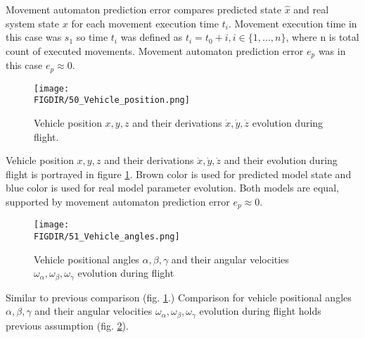 \noindent Movement automaton prediction error compares predicted state $\hat{x}$ and real system state $x$ for each movement execution time $t_i$. Movement execution time in this case was $s_1$ so time $t_i$ was defined as $t_i=t_0+i, i\in\{1,\dots,n\}$, where n is total count of executed movements. Movement automaton prediction error $e_p$ was in this case $e_p\approx 0$.
\begin{figure}[H]
    \centering
    \texttt{[image: \\FIGDIR/50\_Vehicle\_position.png]}
    \caption{Vehicle position $x,y,z$ and their derivations $\dot{x},\dot{y},\dot{z}$ evolution during flight.}
    \label{fig:vehicleStateGrid1}
\end{figure}
\noindent Vehicle position $x,y,z$ and their derivations $\dot{x},\dot{y},\dot{z}$ and their evolution during flight is portrayed in figure \ref{fig:vehicleStateGrid1}. Brown color is used for predicted model state and blue color is used for real model parameter evolution. Both models are equal, supported by movement automaton prediction error $e_p\approx 0$.
\begin{figure}[H]
    \centering
    \texttt{[image: \\FIGDIR/51\_Vehicle\_angles.png]}
    \caption{Vehicle positional angles $\alpha,\beta,\gamma$ and their angular velocities $\omega_\alpha,\omega_\beta,\omega_\gamma$ evolution during flight}
    \label{fig:vehicleStateGrid2}
\end{figure}
\noindent Similar to previous comparison (fig. \ref{fig:vehicleStateGrid1}.) Comparison for vehicle positional angles $\alpha,\beta,\gamma$ and their angular velocities $\omega_\alpha,\omega_\beta,\omega_\gamma$ evolution during flight holds previous assumption (fig. \ref{fig:vehicleStateGrid2}).